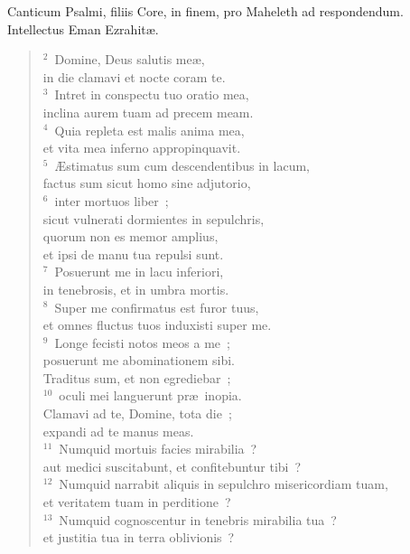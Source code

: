 \bchapter
\lettrine[lines=3,image=true,loversize=0.05,lraise=-0.03]{C}{}anticum Psalmi, filiis Core, in finem, pro Maheleth ad respondendum. Intellectus Eman Ezrahit\ae .
\begin{flushleft}\begin{verse}\vspace{6pt}${}^{2}$~Domine, Deus salutis me\ae ,\\ in die clamavi et nocte coram te.\\
${}^{3}$~Intret in conspectu tuo oratio mea,\\ inclina aurem tuam ad precem meam.\\
${}^{4}$~Quia repleta est malis anima mea,\\ et vita mea inferno appropinquavit.\\
${}^{5}$~\AE stimatus sum cum descendentibus in lacum,\\ factus sum sicut homo sine adjutorio,\\
${}^{6}$~inter mortuos liber~;\\ sicut vulnerati dormientes in sepulchris,\\ quorum non es memor amplius,\\ et ipsi de manu tua repulsi sunt.\\
${}^{7}$~Posuerunt me in lacu inferiori,\\ in tenebrosis, et in umbra mortis.\\
${}^{8}$~Super me confirmatus est furor tuus,\\ et omnes fluctus tuos induxisti super me.\\
${}^{9}$~Longe fecisti notos meos a me~;\\ posuerunt me abominationem sibi.\\ Traditus sum, et non egrediebar~;\\
${}^{10}$~oculi mei languerunt pr\ae\ inopia.\\ Clamavi ad te, Domine, tota die~;\\ expandi ad te manus meas.\\
${}^{11}$~Numquid mortuis facies mirabilia~?\\ aut medici suscitabunt, et confitebuntur tibi~?\\
${}^{12}$~Numquid narrabit aliquis in sepulchro misericordiam tuam,\\ et veritatem tuam in perditione~?\\
${}^{13}$~Numquid cognoscentur in tenebris mirabilia tua~?\\ et justitia tua in terra oblivionis~?\\

\end{verse}
\end{flushleft}
